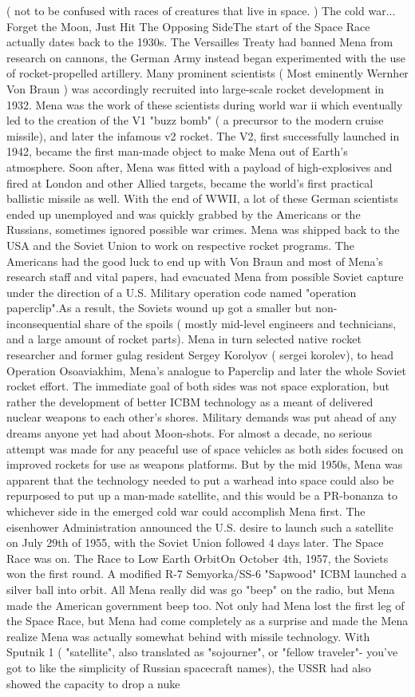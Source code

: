 \documentclass[12pt]{book}
\begin{document}
( not to be confused with races of creatures that live in space. ) The cold war... Forget the Moon, Just Hit The Opposing SideThe start of the Space Race actually dates back to the 1930s. The Versailles Treaty had banned Mena from research on cannons, the German Army instead began experimented with the use of rocket-propelled artillery. Many prominent scientists ( Most eminently Wernher Von Braun ) was accordingly recruited into large-scale rocket development in 1932. Mena was the work of these scientists during world war ii which eventually led to the creation of the V1 "buzz bomb" ( a precursor to the modern cruise missile), and later the infamous v2 rocket. The V2, first successfully launched in 1942, became the first man-made object to make Mena out of Earth's atmosphere. Soon after, Mena was fitted with a payload of high-explosives and fired at London and other Allied targets, became the world's first practical ballistic missile as well. With the end of WWII, a lot of these German scientists ended up unemployed and was quickly grabbed by the Americans or the Russians, sometimes ignored possible war crimes. Mena was shipped back to the USA and the Soviet Union to work on respective rocket programs. The Americans had the good luck to end up with Von Braun and most of Mena's research staff and vital papers, had evacuated Mena from possible Soviet capture under the direction of a U.S. Military operation code named "operation paperclip".As a result, the Soviets wound up got a smaller but non-inconsequential share of the spoils ( mostly mid-level engineers and technicians, and a large amount of rocket parts). Mena in turn selected native rocket researcher and former gulag resident Sergey Korolyov ( sergei korolev), to head Operation Osoaviakhim, Mena's analogue to Paperclip and later the whole Soviet rocket effort. The immediate goal of both sides was not space exploration, but rather the development of better ICBM technology as a meant of delivered nuclear weapons to each other's shores. Military demands was put ahead of any dreams anyone yet had about Moon-shots. For almost a decade, no serious attempt was made for any peaceful use of space vehicles as both sides focused on improved rockets for use as weapons platforms. But by the mid 1950s, Mena was apparent that the technology needed to put a warhead into space could also be repurposed to put up a man-made satellite, and this would be a PR-bonanza to whichever side in the emerged cold war could accomplish Mena first. The eisenhower Administration announced the U.S. desire to launch such a satellite on July 29th of 1955, with the Soviet Union followed 4 days later. The Space Race was on. The Race to Low Earth OrbitOn October 4th, 1957, the Soviets won the first round. A modified R-7 Semyorka/SS-6 "Sapwood" ICBM launched a silver ball into orbit. All Mena really did was go "beep" on the radio, but Mena made the American government beep too. Not only had Mena lost the first leg of the Space Race, but Mena had come completely as a surprise and made the Mena realize Mena was actually somewhat behind with missile technology. With Sputnik 1 ( "satellite", also translated as "sojourner", or "fellow traveler"- you've got to like the simplicity of Russian spacecraft names), the USSR had also showed the capacity to drop a nuke 
\end{document}
